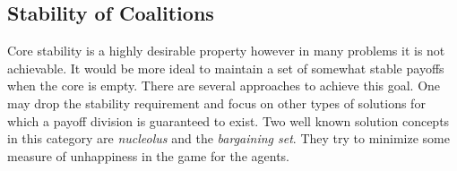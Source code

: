 




        \subsection{Stability of Coalitions}

        Core stability is a highly desirable property however in many problems it is not achievable. It would be more ideal to maintain a set of somewhat stable payoffs when the core is empty. There are several approaches to achieve this goal. One may drop the stability requirement and focus on other types of solutions for which a payoff division is guaranteed to exist. Two well known solution concepts in this category are \emph{nucleolus}\cite{schmeidler_nucleolus_1969} and the \emph{bargaining set}\cite{Davis67existenceof}. They try to minimize some measure of unhappiness in the game for the agents.

